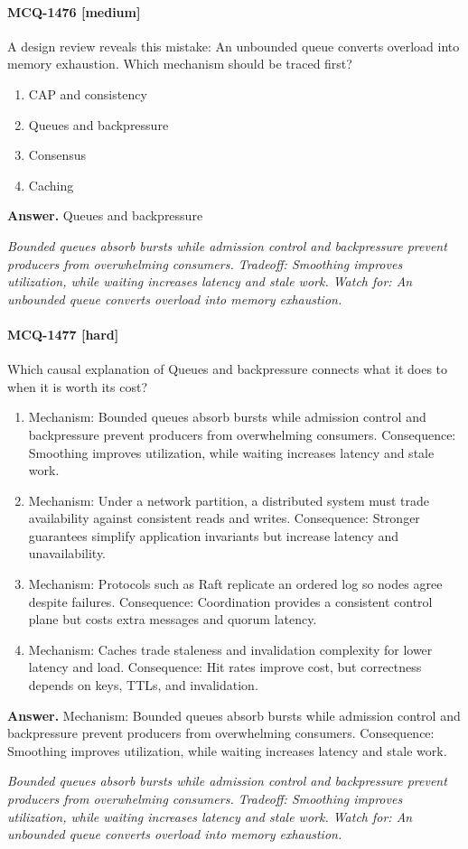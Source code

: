 \paragraph{MCQ-1476 [medium]} A design review reveals this mistake: An unbounded queue converts overload into memory exhaustion. Which mechanism should be traced first?
\begin{enumerate}[label=\Alph*.]
\item CAP and consistency
\item Queues and backpressure
\item Consensus
\item Caching
\end{enumerate}
\noindent\textbf{Answer.} Queues and backpressure
\par\textit{Bounded queues absorb bursts while admission control and backpressure prevent producers from overwhelming consumers. Tradeoff: Smoothing improves utilization, while waiting increases latency and stale work. Watch for: An unbounded queue converts overload into memory exhaustion.}
\paragraph{MCQ-1477 [hard]} Which causal explanation of Queues and backpressure connects what it does to when it is worth its cost?
\begin{enumerate}[label=\Alph*.]
\item Mechanism: Bounded queues absorb bursts while admission control and backpressure prevent producers from overwhelming consumers. Consequence: Smoothing improves utilization, while waiting increases latency and stale work.
\item Mechanism: Under a network partition, a distributed system must trade availability against consistent reads and writes. Consequence: Stronger guarantees simplify application invariants but increase latency and unavailability.
\item Mechanism: Protocols such as Raft replicate an ordered log so nodes agree despite failures. Consequence: Coordination provides a consistent control plane but costs extra messages and quorum latency.
\item Mechanism: Caches trade staleness and invalidation complexity for lower latency and load. Consequence: Hit rates improve cost, but correctness depends on keys, TTLs, and invalidation.
\end{enumerate}
\noindent\textbf{Answer.} Mechanism: Bounded queues absorb bursts while admission control and backpressure prevent producers from overwhelming consumers. Consequence: Smoothing improves utilization, while waiting increases latency and stale work.
\par\textit{Bounded queues absorb bursts while admission control and backpressure prevent producers from overwhelming consumers. Tradeoff: Smoothing improves utilization, while waiting increases latency and stale work. Watch for: An unbounded queue converts overload into memory exhaustion.}
